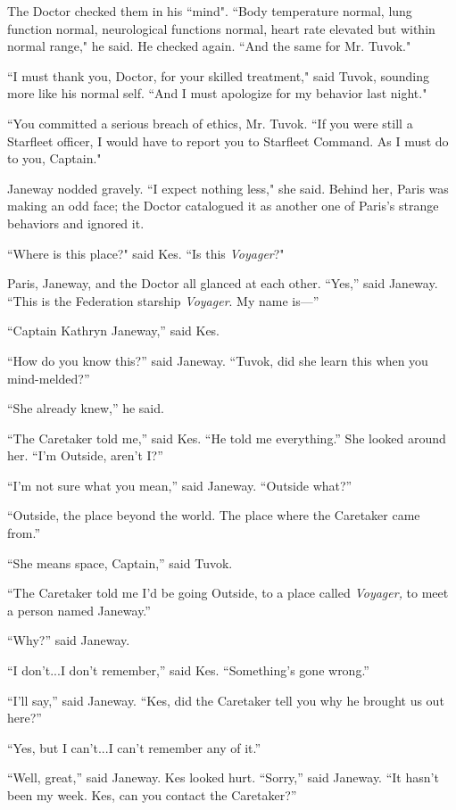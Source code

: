 \documentclass[twoside,letterpaper,12pt]{memoir}
\begin{document}
The Doctor checked them in his ``mind". ``Body temperature normal, lung function normal, neurological functions normal, heart rate elevated but within normal range," he said. He checked again. ``And the same for Mr. Tuvok." 

``I must thank you, Doctor, for your skilled treatment," said Tuvok, sounding more like his normal self. ``And I must apologize for my behavior last night." 

``You committed a serious breach of ethics, Mr. Tuvok. ``If you were still a Starfleet officer, I would have to report you to Starfleet Command. As I must do to you, Captain." 

Janeway nodded gravely. ``I expect nothing less," she said. Behind her, Paris was making an odd face; the Doctor catalogued it as another one of Paris's strange behaviors and ignored it. 

``Where is this place?" said Kes. ``Is this \textit{Voyager}?" 

Paris, Janeway, and the Doctor all glanced at each other. “Yes,” said Janeway. “This is the Federation starship \textit{Voyager}. My name is---” 

``Captain Kathryn Janeway,” said Kes. 

“How do you know this?” said Janeway. “Tuvok, did she learn this when you mind-melded?” 

“She already knew,” he said. 

``The Caretaker told me,” said Kes. “He told me everything.” She looked around her. “I’m Outside, aren’t I?” 

“I’m not sure what you mean,” said Janeway. “Outside what?” 

“Outside, the place beyond the world. The place where the Caretaker came from.” 

“She means space, Captain,” said Tuvok. 

“The Caretaker told me I’d be going Outside, to a place called \textit{Voyager, }to meet a person named Janeway.” 

“Why?” said Janeway. 

“I don’t...I don’t remember,” said Kes. “Something’s gone wrong.” 

“I’ll say,” said Janeway. “Kes, did the Caretaker tell you why he brought us out here?” 

“Yes, but I can’t...I can’t remember any of it.” 

“Well, great,” said Janeway. Kes looked hurt. “Sorry,” said Janeway. “It hasn’t been my week. Kes, can you contact the Caretaker?” 
\end{document}
